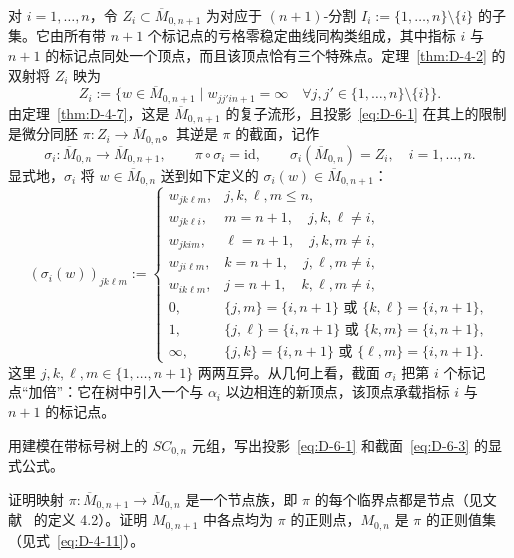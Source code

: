 对 $i=1,\ldots,n$，令 $Z_i\subset\overline M_{0,n+1}$ 为对应于 $(n+1)$-分割 $I_i:=\{1,\ldots,n\}\setminus\{i\}$ 的子集。它由所有带 $n+1$ 个标记点的亏格零稳定曲线同构类组成，其中指标 $i$ 与 $n+1$ 的标记点同处一个顶点，而且该顶点恰有三个特殊点。定理~\ref{thm:D-4-2} 的双射将 $Z_i$ 映为
\begin{equation}\label{eq:D-6-2}
  Z_i:=\bigl\{w\in\overline M_{0,n+1}\mid
  w_{jj'in+1}=\infty\quad
  \forall j,j'\in\{1,\ldots,n\}\setminus\{i\}\bigr\}.
\end{equation}
由定理~\ref{thm:D-4-7}，这是 $\overline M_{0,n+1}$ 的复子流形，且投影~\eqref{eq:D-6-1} 在其上的限制是微分同胚 $\pi:Z_i\to\overline M_{0,n}$。其逆是 $\pi$ 的截面，记作
\begin{equation}\label{eq:D-6-3}
  \sigma_i:\overline M_{0,n}\longrightarrow\overline M_{0,n+1},
  \qquad \pi\circ\sigma_i=\mathrm{id},\qquad
  \sigma_i(\overline M_{0,n})=Z_i,\quad i=1,\ldots,n.
\end{equation}
显式地，$\sigma_i$ 将 $w\in\overline M_{0,n}$ 送到如下定义的 $\sigma_i(w)\in\overline M_{0,n+1}$：
\[
  (\sigma_i(w))_{jk\ell m}:=
  \begin{cases}
    w_{jk\ell m},&j,k,\ell,m\le n,\\
    w_{jk\ell i},&m=n+1,\quad j,k,\ell\ne i,\\
    w_{jkim},&\ell=n+1,\quad j,k,m\ne i,\\
    w_{ji\ell m},&k=n+1,\quad j,\ell,m\ne i,\\
    w_{ik\ell m},&j=n+1,\quad k,\ell,m\ne i,\\
    0,&\{j,m\}=\{i,n+1\}\text{ 或 }\{k,\ell\}=\{i,n+1\},\\
    1,&\{j,\ell\}=\{i,n+1\}\text{ 或 }\{k,m\}=\{i,n+1\},\\
    \infty,&\{j,k\}=\{i,n+1\}\text{ 或 }\{\ell,m\}=\{i,n+1\}.
  \end{cases}
\]
这里 $j,k,\ell,m\in\{1,\ldots,n+1\}$ 两两互异。从几何上看，截面 $\sigma_i$ 把第 $i$ 个标记点“加倍”：它在树中引入一个与 $\alpha_i$ 以边相连的新顶点，该顶点承载指标 $i$ 与 $n+1$ 的标记点。

\begin{exercise}\label{ex:D-6-1}
用建模在带标号树上的 $SC_{0,n}$ 元组，写出投影~\eqref{eq:D-6-1} 和截面~\eqref{eq:D-6-3} 的显式公式。
\end{exercise}

\begin{exercise}\label{ex:D-6-2}
证明映射 $\pi:\overline M_{0,n+1}\to\overline M_{0,n}$ 是一个节点族，即 $\pi$ 的每个临界点都是节点（见文献~ 的定义 4.2）。证明 $M_{0,n+1}$ 中各点均为 $\pi$ 的正则点，$M_{0,n}$ 是 $\pi$ 的正则值集（见式~\eqref{eq:D-4-11}）。
\end{exercise}

